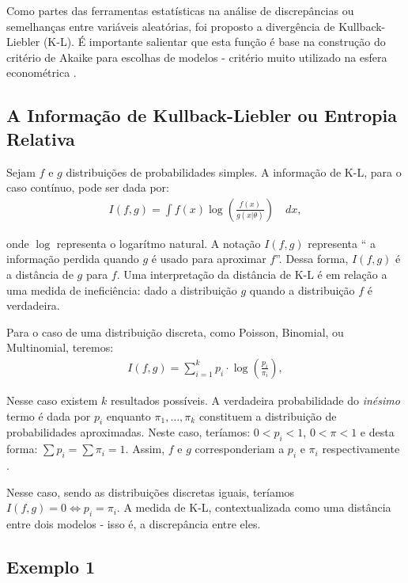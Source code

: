 Como partes das ferramentas estatísticas na análise de discrepâncias ou semelhanças entre variáveis aleatórias, foi proposto a divergência de Kullback-Liebler (K-L). É importante salientar que esta função é base na construção do critério de Akaike para escolhas de modelos - critério muito utilizado na esfera econométrica \cite{wooldridge2006introduccao, gujarati2011econometria}.

\subsection{A Informação de Kullback-Liebler ou Entropia Relativa}

Sejam $f$ e $g$ distribuições de probabilidades simples. A informação de K-L, para o caso contínuo, pode ser dada por: 
\begin{align*}
I(f, g) = \int f(x)\log\left(\frac{f(x)}{g(x|\theta)}\right) \quad dx,
\end{align*}

onde $\log$ representa o logarítmo natural. A notação $I(f, g)$ representa `` a informação perdida quando $g$ é usado para aproximar $f$''. Dessa forma, $I(f, g)$ é a distância de $g$ para $f$. Uma interpretação da distância de K-L é em relação a uma medida de ineficiência: dado a distribuição $g$ quando a distribuição $f$ é verdadeira.

Para o caso de uma distribuição discreta, como Poisson, Binomial, ou Multinomial, teremos:
\begin{align*}
I(f, g) = \sum_{i=1}^{k} p_{i} \cdot \log\left( \frac{p_i}{\pi_i}\right),
\end{align*}

Nesse caso existem $k$ resultados possíveis. A verdadeira probabilidade do \textit{inésimo} termo é dada por $p_i$ enquanto $\pi_1, \dots, \pi_k$ constituem a distribuição de probabilidades aproximadas. Neste caso, teríamos: $0 < p_i < 1$, $0 < \pi < 1$ e desta forma: $\sum p_i = \sum \pi_i = 1$. Assim, $f$ e $g$ corresponderiam a $p_i$ e $\pi_i$ respectivamente \cite[p. 51]{burnham2002practical}.

Nesse caso, sendo as distribuições discretas iguais, teríamos $I(f,g) = 0 \iff p_i = \pi_i$. A medida de K-L, contextualizada como uma distância entre dois modelos - isso é, a discrepância entre eles.

\subsection{Exemplo 1}


